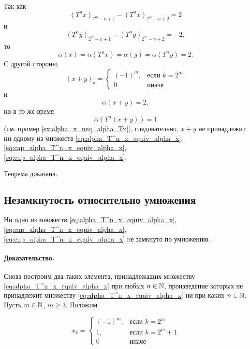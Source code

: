Так как
\begin{equation}
	(T^n x)_{2^m-n+1} - (T^n x)_{2^m-n+2} = 2
\end{equation}
и
\begin{equation}
	(T^n y)_{2^m-n+1} - (T^n y)_{2^m-n+2} = -2
	,
\end{equation}
то
\begin{equation}
	\alpha(x) = \alpha(T^n x) = \alpha(y) = \alpha(T^n y) = 2
	.
\end{equation}
С другой стороны,
\begin{equation}
	(x+y)_k = \begin{cases}
		(-1)^m,  & \mbox{если } k = 2^m     \\
		0        & \mbox{иначе }
	\end{cases}
\end{equation}
и
\begin{equation}
	\alpha(x+y) = 2
	,
\end{equation}
но в то же время
\begin{equation}
	\alpha(T^n(x+y)) = 1
\end{equation}
(см. пример \ref{ex:alpha_x_neq_alpha_Tx}),
следовательно, $x+y$ не принадлежит ни одному из множеств
\eqref{eq:alpha_T^n_x_equiv_alpha_x}, \eqref{eq:cap_alpha_T^n_x_equiv_alpha_x}, \eqref{eq:cup_alpha_T^n_x_equiv_alpha_x}.

Теорема доказана.



\subsection{Незамкнутость относительно умножения}

\begin{theorem}
	Ни одно из множеств
	\eqref{eq:alpha_T^n_x_equiv_alpha_x}, \eqref{eq:cap_alpha_T^n_x_equiv_alpha_x}, \eqref{eq:cup_alpha_T^n_x_equiv_alpha_x}
	не замкнуто по умножению.
\end{theorem}

\paragraph{Доказательство.}
Снова построим два таких элемента, принадлежащих множеству \eqref{eq:alpha_T^n_x_equiv_alpha_x} при любых $n\in\mathbb{N}$,
произведение которых не принадлежит множеству \eqref{eq:alpha_T^n_x_equiv_alpha_x} ни при каких $n\in\mathbb{N}$.
Пусть $m\in\mathbb{N}$, $m \geq 3$.
Положим

\begin{equation}
	x_k = \begin{cases}
		(-1)^m,  & \mbox{если } k = 2^m     \\
		1,                   & \mbox{если } k = 2^m + 1 \\
		0                    & \mbox{иначе }
	\end{cases}
\end{equation}

